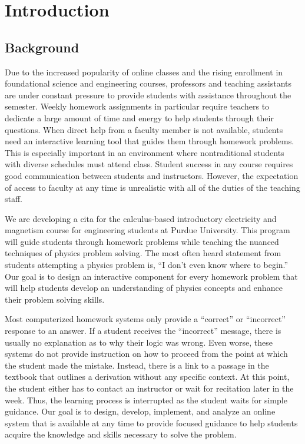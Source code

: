 \chapter[Introduction]{Introduction}

\section{Background}

Due to the increased popularity of online classes and the rising enrollment in foundational science and engineering courses, professors and teaching assistants are under constant pressure to provide students with assistance throughout the semester. Weekly homework assignments in particular require teachers to dedicate a large amount of time and energy to help students through their questions. When direct help from a faculty member is not available, students need an interactive learning tool that guides them through homework problems. This is especially important in an environment where nontraditional students with diverse schedules must attend class\cite{choy2002, horn1996}. Student success in any course requires good communication between students and instructors. However, the expectation of access to faculty at any time is unrealistic with all of the duties of the teaching staff.

We are developing a \gls{cita} for the calculus-based introductory electricity and magnetism course for engineering students at Purdue University. This program will guide students through homework problems while teaching the nuanced techniques of physics problem solving. The most often heard statement from students attempting a physics problem is, ``I don’t even know where to begin.'' Our goal is to design an interactive component for every homework problem that will help students develop an understanding of physics concepts and enhance their problem solving skills.

Most computerized homework systems only provide a ``correct'' or ``incorrect'' response to an answer. If a student receives the ``incorrect'' message, there is usually no explanation as to why their logic was wrong. Even worse, these systems do not provide instruction on how to proceed from the point at which the student made the mistake. Instead, there is a link to a passage in the textbook that outlines a derivation without any specific context. At this point, the student either has to contact an instructor or wait for recitation later in the week. Thus, the learning process is interrupted as the student waits for simple guidance. Our goal is to design, develop, implement, and analyze an online system that is available at any time to provide focused guidance to help students acquire the knowledge and skills necessary to solve the problem.


